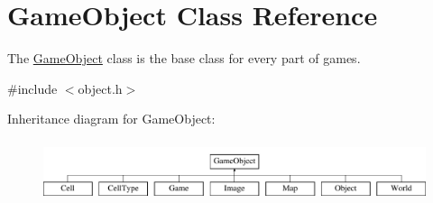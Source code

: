 \hypertarget{class_game_object}{\section{\-Game\-Object \-Class \-Reference}
\label{class_game_object}
}


\-The \hyperlink{class_game_object}{\-Game\-Object} class is the base class for every part of games.  




{\ttfamily \#include $<$object.\-h$>$}

\-Inheritance diagram for \-Game\-Object\-:\begin{figure}[H]
\begin{center}
\leavevmode
\includegraphics[height=1.797753cm]{class_game_object}
\end{center}
\end{figure}
